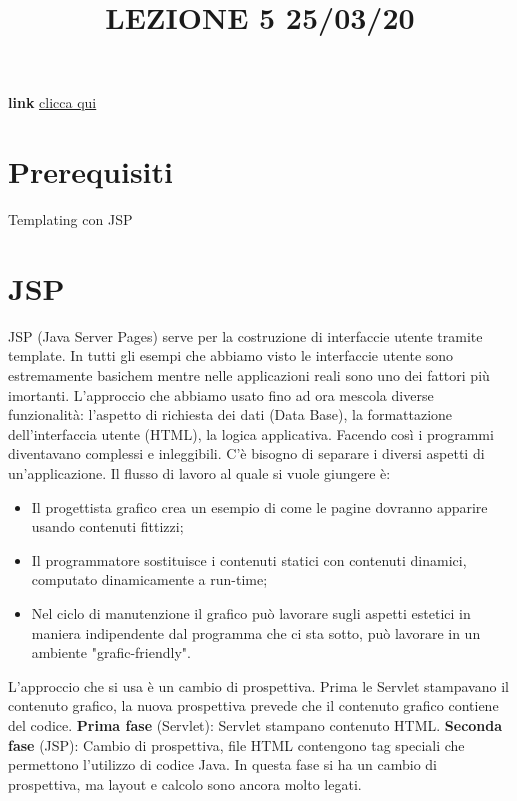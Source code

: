 \title{LEZIONE 5 25/03/20}\newline
\textbf{link} \href{https://web.microsoftstream.com/video/2534f028-dc3d-4987-9905-66f2994ce127}{clicca qui}
\section*{Prerequisiti}
Templating con JSP
\section{JSP}
JSP (Java Server Pages) serve per la costruzione di interfaccie utente tramite template.\newline
\newline
In tutti gli esempi che abbiamo visto le interfaccie utente sono estremamente basichem mentre nelle applicazioni reali sono uno dei fattori più imortanti.\newline
\newline
L'approccio che abbiamo usato fino ad ora mescola diverse funzionalità: l'aspetto di richiesta dei dati (Data Base), la formattazione dell'interfaccia utente (HTML), la logica applicativa. Facendo così i programmi diventavano complessi e inleggibili. C'è bisogno di separare i diversi aspetti di un'applicazione.\newline
Il flusso di lavoro al quale si vuole giungere è:
\begin{itemize}
    \item Il progettista grafico crea un esempio di come le pagine dovranno apparire usando contenuti fittizzi;
    \item Il programmatore sostituisce i contenuti statici con contenuti dinamici, computato dinamicamente a run-time;
    \item Nel ciclo di manutenzione il grafico può lavorare sugli aspetti estetici in maniera indipendente dal programma che ci sta sotto, può lavorare in un ambiente "grafic-friendly".
\end{itemize}
L'approccio che si usa è un cambio di prospettiva. Prima le Servlet stampavano il contenuto grafico, la nuova prospettiva prevede che il contenuto grafico contiene del codice.\newline
\newline
\textbf{Prima fase} (Servlet): Servlet stampano contenuto HTML.\newline
\newline
\textbf{Seconda fase} (JSP): Cambio di prospettiva, file HTML contengono tag speciali che permettono l'utilizzo di codice Java. In questa fase si ha un cambio di prospettiva, ma layout e calcolo sono ancora molto legati.\newline
